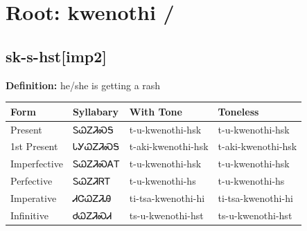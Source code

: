 \documentclass{article}%
\begin{document}
%
\normalsize%
\section*{Root: kwenothi / }%
\subsection*{sk-s-hst[imp2]}%
\textbf{Definition: }%
he/she is getting a rash%
\\[0.5em]%
\begin{tabular}{|l|l|l|l|}%
\hline%
\textbf{Form}&\textbf{Syllabary}&\textbf{With Tone}&\textbf{Toneless}\\%
\hline%
Present&ᏚᏇᏃᏘᏍᎦ&t{-}u{-}kwenothi{-}hsk&t{-}u{-}kwenothi{-}hsk\\%
1st Present&ᏓᎩᏇᏃᏘᏍᎦ&t{-}aki{-}kwenothi{-}hsk&t{-}aki{-}kwenothi{-}hsk\\%
Imperfective&ᏚᏇᏃᏘᏍᎪᎢ&t{-}u{-}kwenothi{-}hsk&t{-}u{-}kwenothi{-}hsk\\%
Perfective&ᏚᏇᏃᏘᏒᎢ&t{-}u{-}kwenothi{-}hs&t{-}u{-}kwenothi{-}hs\\%
Imperative&ᏗᏣᏇᏃᏘᎯ&ti{-}tsa{-}kwenothi{-}hi&ti{-}tsa{-}kwenothi{-}hi\\%
Infinitive&ᏧᏇᏃᏘᏍᏗ&ts{-}u{-}kwenothi{-}hst&ts{-}u{-}kwenothi{-}hst\\%
\hline%
\end{tabular}%
\\[1em]%
\end{document}
